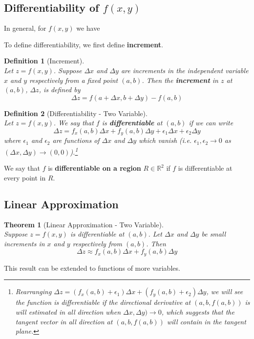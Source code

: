 \documentclass[12pt]{article}
\newtheorem{definition}{Definition}[section]
\newtheorem{theorem}{Theorem}[section]
\theoremstyle{definition}
\begin{document}
\subsection{Differentiability of $f(x,y)$}
In general, for $f(x,y)$ we have
\begin{center}
\end{center}
To define differentiability, we first define \textbf{increment}.
\begin{definition}[Increment]\hfill\\\normalfont Let $z=f(x,y)$. Suppose $\Delta x$ and $\Delta y$ are increments in the \textit{independent} variable $x$ and $y$ respectively from a fixed point $(a,b)$. Then the \textbf{increment} in $z$ at $(a,b)$, $\Delta z$, is defined by
\[
\Delta z = f(a+\Delta x, b+\Delta y)-f(a,b)
\]
\end{definition}
\begin{definition}[Differentiability - Two Variable]
\hfill\\\normalfont Let $z=f(x,y)$. We say that $f$ is \textbf{differentiable} at $(a,b)$ if we can write
\[
\Delta z = f_x(a,b)\Delta x+f_y(a,b)\Delta y+\epsilon_1\Delta x + \epsilon_2\Delta y
\]
where $\epsilon_1$ and $\epsilon_2$ are functions of $\Delta x$ and $\Delta y$ which vanish (i.e. $\epsilon_1,\epsilon_2\to 0$ as $(\Delta x,\Delta y)\to(0,0)$).\footnote{Rearranging $\Delta z = (f_x(a,b)+\epsilon_1)\Delta x+(f_y(a,b)+\epsilon_2)\Delta y$, we will see the function is differentiable if the directional derivative at $(a,b,f(a,b))$ is will estimated in all direction when $\Delta x,\Delta y)\to 0$, which suggests that the tangent vector in all direction at $(a,b,f(a,b))$ will contain in the tangent plane.}
\end{definition}
We say that $f$ is \textbf{differentiable on a region} $R\in\mathbb{R}^2$ if $f$ is differentiable at every point in $R$.
\subsection{Linear Approximation}
\begin{theorem}[Linear Approximation - Two Variable]
\hfill\\\normalfont Suppose $z=f(x,y)$ is \textit{differentiable} at $(a,b)$. Let $\Delta x$ and $\Delta y$ be small increments in $x$ and $y$ respectively from $(a,b)$. Then
\[
\Delta z \approx f_x(a,b)\Delta x+f_y(a,b)\Delta y
\]
\end{theorem}
This result can be extended to functions of more variables.
\end{document}

